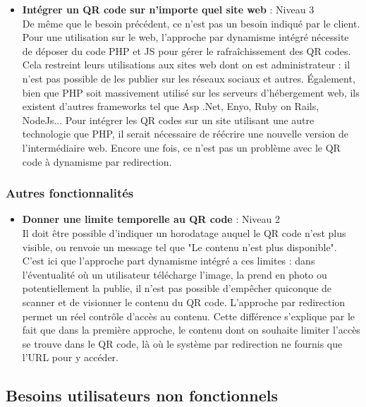 \documentclass[a4paper,12pt]{article}
\begin{document}
\begin{itemize}
  \item \textbf{Intégrer un QR code sur n'importe quel site web} : Niveau 3\\
  De même que le besoin précédent, ce n'est pas un besoin indiqué par le client. Pour une utilisation sur le web, l'approche par dynamisme intégré nécessite de déposer du code PHP et JS pour gérer le rafraîchissement des QR codes. Cela restreint leurs utilisations aux sites web dont on est administrateur : il n’est pas possible de les publier sur les réseaux sociaux et autres. Également, bien que PHP soit massivement utilisé sur les serveurs d’hébergement web, ils existent d’autres frameworks tel que Asp .Net, Enyo, Ruby on Rails, NodeJs... Pour intégrer les QR codes sur un site utilisant une autre technologie que PHP, il serait nécessaire de réécrire une nouvelle version de l’intermédiaire web.
  Encore une fois, ce n'est pas un problème avec le QR code à dynamisme par redirection.\\
  
\end{itemize}

\subsubsection{Autres fonctionnalités}

\begin{itemize}
  
  \item \textbf{Donner une limite temporelle au QR code} : Niveau 2\\
  Il doit être possible d'indiquer un horodatage auquel le QR code n'est plus visible, ou renvoie un message tel que "Le contenu n'est plus disponible". C'est ici que l'approche part dynamisme intégré a ces limites : dans l’éventualité où un utilisateur télécharge l’image, la prend en photo ou potentiellement la publie, il n’est pas possible d’empêcher quiconque de scanner et de visionner le contenu du QR code. L'approche par redirection permet un réel contrôle d'accès au contenu. Cette différence s'explique par le fait que dans la première approche, le contenu dont on souhaite limiter l'accès se trouve dans le QR code, là où le système par redirection ne fournis que l'URL pour y accéder.\\
  
\end{itemize}

\subsection{Besoins utilisateurs non fonctionnels}
\end{document}
